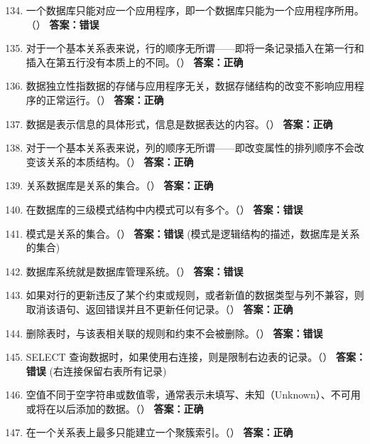 \documentclass[12pt, a4paper]{article}
\begin{document}
\begin{enumerate}[label=\arabic*.]
    \setcounter{enumi}{133}
    \item 一个数据库只能对应一个应用程序，即一个数据库只能为一个应用程序所用。（\quad）
    \textbf{答案：错误}

    \item 对于一个基本关系表来说，行的顺序无所谓——即将一条记录插入在第一行和插入在第五行没有本质上的不同。（\quad）
    \textbf{答案：正确}

    \item 数据独立性指数据的存储与应用程序无关，数据存储结构的改变不影响应用程序的正常运行。（\quad）
    \textbf{答案：正确}

    \item 数据是表示信息的具体形式，信息是数据表达的内容。（\quad）
    \textbf{答案：正确}

    \item 对于一个基本关系表来说，列的顺序无所谓——即改变属性的排列顺序不会改变该关系的本质结构。（\quad）
    \textbf{答案：正确}

    \item 关系数据库是关系的集合。（\quad）
    \textbf{答案：正确}

    \item 在数据库的三级模式结构中内模式可以有多个。（\quad）
    \textbf{答案：错误}

    \item 模式是关系的集合。（\quad）
    \textbf{答案：错误} (模式是逻辑结构的描述，数据库是关系的集合)

    \item 数据库系统就是数据库管理系统。（\quad）
    \textbf{答案：错误}

    \item 如果对行的更新违反了某个约束或规则，或者新值的数据类型与列不兼容，则取消该语句、返回错误并且不更新任何记录。（\quad）
    \textbf{答案：正确}

    \item 删除表时，与该表相关联的规则和约束不会被删除。（\quad）
    \textbf{答案：错误}

    \item SELECT 查询数据时，如果使用右连接，则是限制右边表的记录。（\quad）
    \textbf{答案：错误} (右连接保留右表所有记录)

    \item 空值不同于空字符串或数值零，通常表示未填写、未知（Unknown）、不可用或将在以后添加的数据。（\quad）
    \textbf{答案：正确}

    \item 在一个关系表上最多只能建立一个聚簇索引。（\quad）
    \textbf{答案：正确}


\end{enumerate}
\end{document}
